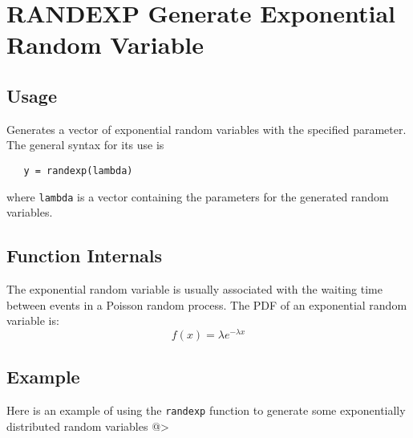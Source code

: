 \section{RANDEXP Generate Exponential Random Variable}

\subsection{Usage}

Generates a vector of exponential random variables with
the specified parameter.  The general syntax for its use is
\begin{verbatim}
   y = randexp(lambda)
\end{verbatim}
where \verb|lambda| is a vector containing the parameters for
the generated random variables.
\subsection{Function Internals}

The exponential random variable is usually associated with
the waiting time between events in a Poisson random process.
The PDF of an exponential random variable is:
\[
   f(x) = \lambda e^{-\lambda x}
\]
\subsection{Example}

Here is an example of using the \verb|randexp| function to generate
some exponentially distributed random variables
@>
